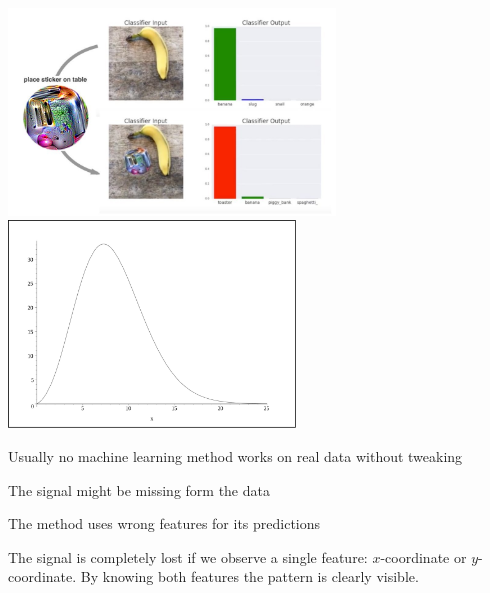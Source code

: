 \documentclass[landscape,footrule]{foils}
\begin{document}
\begin{tabbing}
   \> \includegraphics[height = 5.5cm]{adversarial-learning}
   \> \includegraphics[height = 5.5cm, trim=-4.5cm 0cm -4.5cm 0cm, clip]{curse-of-dimensions}
\end{tabbing}







Usually no machine learning method works on real data without tweaking 
\begin{triangles}
 \item The signal might be missing form the data 
 \item The method uses wrong features for its predictions 
\end{triangles}




The signal is completely lost if we observe a single feature: $x$-coordinate or $y$-coordinate. By knowing both features the pattern is clearly visible.



\end{document}

